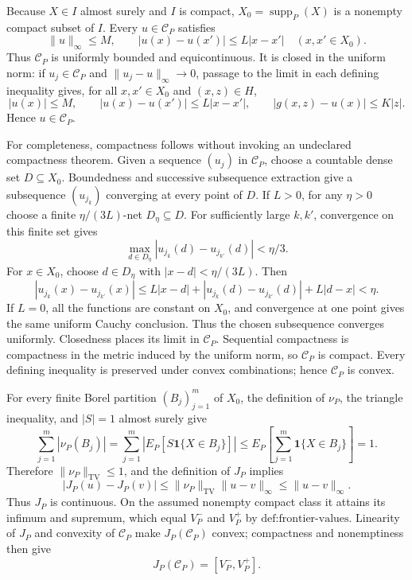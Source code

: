 Because \(X\in I\) almost surely and \(I\) is compact, \(X_0=\operatorname{supp}_P(X)\) is a nonempty compact subset of \(I\).  Every \(u\in\mathcal C_P\) satisfies
\[
 \|u\|_\infty\leq M,
 \qquad
 |u(x)-u(x')|\leq L|x-x'|
 \quad(x,x'\in X_0).
\]
Thus \(\mathcal C_P\) is uniformly bounded and equicontinuous.  It is closed in the uniform norm: if \(u_j\in\mathcal C_P\) and \(\|u_j-u\|_\infty\to0\), passage to the limit in each defining inequality gives, for all \(x,x'\in X_0\) and \((x,z)\in H\),
\[
 |u(x)|\leq M,
 \qquad
 |u(x)-u(x')|\leq L|x-x'|,
 \qquad
 |g(x,z)-u(x)|\leq K|z|.
\]
Hence \(u\in\mathcal C_P\).

For completeness, compactness follows without invoking an undeclared compactness theorem.  Given a sequence \((u_j)\) in \(\mathcal C_P\), choose a countable dense set \(D\subseteq X_0\).  Boundedness and successive subsequence extraction give a subsequence \((u_{j_k})\) converging at every point of \(D\).  If \(L>0\), for any \(\eta>0\) choose a finite \(\eta/(3L)\)-net \(D_\eta\subseteq D\).  For sufficiently large \(k,k'\), convergence on this finite set gives
\[
 \max_{d\in D_\eta}|u_{j_k}(d)-u_{j_{k'}}(d)|<\eta/3.
\]
For \(x\in X_0\), choose \(d\in D_\eta\) with \(|x-d|<\eta/(3L)\).  Then
\[
 |u_{j_k}(x)-u_{j_{k'}}(x)|
 \leq L|x-d|+|u_{j_k}(d)-u_{j_{k'}}(d)|+L|d-x|<\eta.
\]
If \(L=0\), all the functions are constant on \(X_0\), and convergence at one point gives the same uniform Cauchy conclusion.  Thus the chosen subsequence converges uniformly.  Closedness places its limit in \(\mathcal C_P\).  Sequential compactness is compactness in the metric induced by the uniform norm, so \(\mathcal C_P\) is compact.  Every defining inequality is preserved under convex combinations; hence \(\mathcal C_P\) is convex.

For every finite Borel partition \((B_j)_{j=1}^m\) of \(X_0\), the definition of \(\nu_P\), the triangle inequality, and \(|S|=1\) almost surely give
\[
 \sum_{j=1}^m|\nu_P(B_j)|
 =\sum_{j=1}^m\left|E_P[S\mathbf 1\{X\in B_j\}]\right|
 \leq E_P\!\left[\sum_{j=1}^m\mathbf 1\{X\in B_j\}\right]=1.
\]
Therefore \(\|\nu_P\|_{\mathrm{TV}}\leq1\), and the definition of \(J_P\) implies
\[
 |J_P(u)-J_P(v)|
 \leq \|\nu_P\|_{\mathrm{TV}}\|u-v\|_\infty
 \leq\|u-v\|_\infty.
\]
Thus \(J_P\) is continuous.  On the assumed nonempty compact class it attains its infimum and supremum, which equal \(V_P^-\) and \(V_P^+\) by \(\text{def:frontier-values}\).  Linearity of \(J_P\) and convexity of \(\mathcal C_P\) make \(J_P(\mathcal C_P)\) convex; compactness and nonemptiness then give
\[
 J_P(\mathcal C_P)=[V_P^-,V_P^+].
\]

